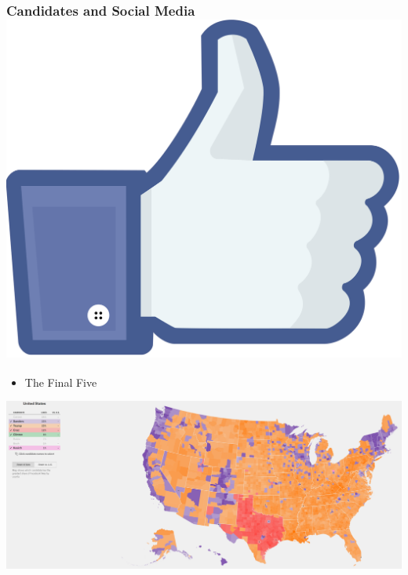 \documentclass[xcolor=dvipsnames]{beamer}
\begin{document}
\begin{frame}
\frametitle{Candidates and Social Media  \hfill \includegraphics[scale=.015]{images/likes.png}}

\begin{itemize}
\item The Final Five
\end{itemize}
\begin{center}

\includegraphics[scale=.14]{currentcandidate.png}
\end{center}
\end{frame}
\end{document}
